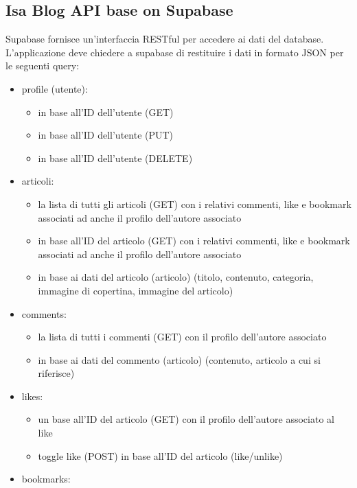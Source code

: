 \documentclass{article}
\begin{document}
\subsection{Isa Blog API base on Supabase}

Supabase fornisce un'interfaccia RESTful per accedere ai dati del database.
L'applicazione deve chiedere a supabase di restituire i dati in formato JSON per le seguenti query:

\begin{itemize}
    \item profile (utente):
    \begin{itemize}
        \item in base all'ID dell'utente (GET)
        \item in base all'ID dell'utente (PUT)
        \item in base all'ID dell'utente (DELETE)
    \end{itemize}
    \item articoli:
    \begin{itemize}
        \item la lista di tutti gli articoli (GET) con i relativi commenti, like e bookmark associati ad anche il profilo dell'autore associato
        \item in base all'ID del articolo (GET) con i relativi commenti, like e bookmark associati ad anche il profilo dell'autore associato
        \item in base ai dati del articolo (articolo) (titolo, contenuto, categoria, immagine di copertina, immagine del articolo)
    \end{itemize}
    \item comments:
    \begin{itemize}
        \item la lista di tutti i commenti (GET) con il profilo dell'autore associato
        \item in base ai dati del commento (articolo) (contenuto, articolo a cui si riferisce)
    \end{itemize}
    \item likes:
    \begin{itemize}
        \item un base all'ID del articolo (GET) con il profilo dell'autore associato al like
        \item toggle like (POST) in base all'ID del articolo (like/unlike)
    \end{itemize}
    \item bookmarks:

\end{itemize}
\end{document}
